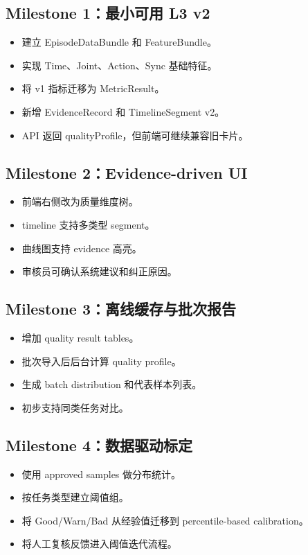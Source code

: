 \documentclass[UTF8,zihao=-4,oneside,openany]{ctexrep}
\begin{document}
\subsection{Milestone 1：最小可用 L3 v2}

\begin{itemize}
\item 建立 EpisodeDataBundle 和 FeatureBundle。
\item 实现 Time、Joint、Action、Sync 基础特征。
\item 将 v1 指标迁移为 MetricResult。
\item 新增 EvidenceRecord 和 TimelineSegment v2。
\item API 返回 qualityProfile，但前端可继续兼容旧卡片。
\end{itemize}

\subsection{Milestone 2：Evidence-driven UI}

\begin{itemize}
\item 前端右侧改为质量维度树。
\item timeline 支持多类型 segment。
\item 曲线图支持 evidence 高亮。
\item 审核员可确认系统建议和纠正原因。
\end{itemize}

\subsection{Milestone 3：离线缓存与批次报告}

\begin{itemize}
\item 增加 quality result tables。
\item 批次导入后后台计算 quality profile。
\item 生成 batch distribution 和代表样本列表。
\item 初步支持同类任务对比。
\end{itemize}

\subsection{Milestone 4：数据驱动标定}

\begin{itemize}
\item 使用 approved samples 做分布统计。
\item 按任务类型建立阈值组。
\item 将 Good/Warn/Bad 从经验值迁移到 percentile-based calibration。
\item 将人工复核反馈进入阈值迭代流程。
\end{itemize}
\end{document}
